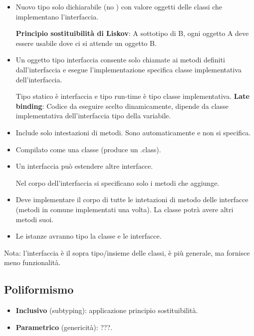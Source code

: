 \begin{itemize}
	\item Nuovo tipo solo dichiarabile (no ) con valore oggetti delle classi che implementano l'interfaccia.

	\textbf{Principio sostituibilità di Liskov}: A sottotipo di B, ogni oggetto A deve essere usabile dove ci si attende un oggetto B.
	\item Un oggetto tipo interfaccia consente solo chiamate ai metodi definiti dall'interfaccia e esegue l'implementazione specifica classe implementativa dell'interfaccia.


	Tipo statico è interfaccia e tipo run-time è tipo classe implementativa.
	\textbf{Late binding}: Codice da eseguire scelto dinamicamente, dipende da classe implementativa dell'interfaccia tipo della variabile.

	\item Include solo intestazioni di metodi. Sono automaticamente  e non si specifica.
	\item Compilato come una classe (produce un .class).

	\item Un interfaccia può estendere altre interfacce.


	Nel corpo dell'interfaccia si specificano solo i metodi che aggiunge.
\end{itemize}


\begin{itemize}
	\item Deve implementare il corpo di tutte le intetazioni di metodo delle interfacce (metodi in comune implementati una volta). La classe potrà avere altri metodi suoi.
	\item Le istanze avranno tipo la classe e le interfacce.
\end{itemize}

Nota: l'interfaccia è il sopra tipo/insieme delle classi, è più generale, ma fornisce meno funzionalità.

\subsection{Poliformismo}
\begin{itemize}
	\item \textbf{Inclusivo} (subtyping): applicazione principio sostituibilità.
	\item \textbf{Parametrico} (genericità): ???.
\end{itemize}